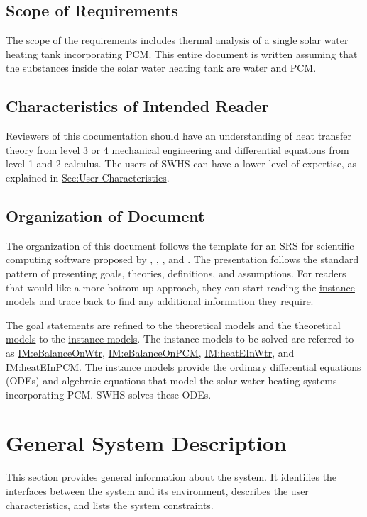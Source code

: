 \documentclass[12pt]{article}
\begin{document}
\subsection{Scope of Requirements}
\label{Sec:ReqsScope}
The scope of the requirements includes thermal analysis of a single solar water heating tank incorporating PCM. This entire document is written assuming that the substances inside the solar water heating tank are water and PCM.

\subsection{Characteristics of Intended Reader}
\label{Sec:ReaderChars}
Reviewers of this documentation should have an understanding of heat transfer theory from level 3 or 4 mechanical engineering and differential equations from level 1 and 2 calculus. The users of SWHS can have a lower level of expertise, as explained in \hyperref[Sec:UserChars]{Sec:User Characteristics}.

\subsection{Organization of Document}
\label{Sec:DocOrg}
The organization of this document follows the template for an SRS for scientific computing software proposed by \cite{koothoor2013}, \cite{smithLai2005}, \cite{smithEtAl2007}, and \cite{smithKoothoor2016}. The presentation follows the standard pattern of presenting goals, theories, definitions, and assumptions. For readers that would like a more bottom up approach, they can start reading the \hyperref[Sec:IMs]{instance models} and trace back to find any additional information they require.

The \hyperref[Sec:GoalStmt]{goal statements} are refined to the theoretical models and the \hyperref[Sec:TMs]{theoretical models} to the \hyperref[Sec:IMs]{instance models}. The instance models to be solved are referred to as \hyperref[IM:eBalanceOnWtr]{IM:eBalanceOnWtr}, \hyperref[IM:eBalanceOnPCM]{IM:eBalanceOnPCM}, \hyperref[IM:heatEInWtr]{IM:heatEInWtr}, and \hyperref[IM:heatEInPCM]{IM:heatEInPCM}. The instance models provide the ordinary differential equations (ODEs) and algebraic equations that model the solar water heating systems incorporating PCM. SWHS solves these ODEs.

\section{General System Description}
\label{Sec:GenSysDesc}
This section provides general information about the system. It identifies the interfaces between the system and its environment, describes the user characteristics, and lists the system constraints.
\end{document}
